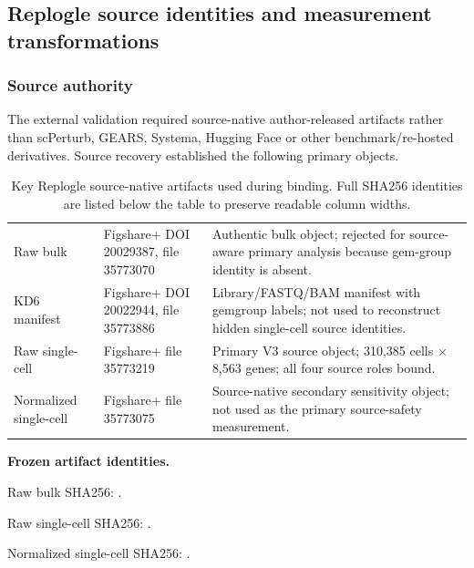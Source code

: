 \documentclass[11pt]{article}
\begin{document}
\subsection{Replogle source identities and measurement transformations}
\subsubsection{Source authority}
The external validation required source-native author-released artifacts rather than scPerturb, GEARS, Systema, Hugging Face or other benchmark/re-hosted derivatives. Source recovery established the following primary objects.

\begin{table}[htbp]
\centering
\caption{Key Replogle source-native artifacts used during binding. Full SHA256 identities are listed below the table to preserve readable column widths.}
\small
\begin{tabularx}{\textwidth}{@{}>{\raggedright\arraybackslash}L{0.27\textwidth}>{\raggedright\arraybackslash}L{0.19\textwidth}>{\raggedright\arraybackslash}X@{}}
\toprule
{} &  &  \\
\midrule
Raw bulk & Figshare+ DOI 20029387, file 35773070 & Authentic bulk object; rejected for source-aware primary analysis because gem-group identity is absent. \\
KD6 manifest & Figshare+ DOI 20022944, file 35773886 & Library/FASTQ/BAM manifest with gemgroup labels; not used to reconstruct hidden single-cell source identities. \\
Raw single-cell & Figshare+ file 35773219 & Primary V3 source object; 310,385 cells $\times$ 8,563 genes; all four source roles bound. \\
Normalized single-cell & Figshare+ file 35773075 & Source-native secondary sensitivity object; not used as the primary source-safety measurement. \\
\bottomrule
\end{tabularx}
\end{table}

\noindent\textbf{Frozen artifact identities.}\par
\begingroup\small
\setlength{\parindent}{0pt}\setlength{\parskip}{2pt}
Raw bulk SHA256: \texttt{}.\par
Raw single-cell SHA256: \texttt{}.\par
Normalized single-cell SHA256: \texttt{}.
\endgroup
\end{document}
